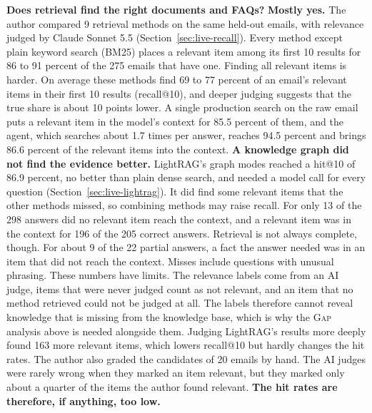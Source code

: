 \textbf{Does retrieval find the right documents and FAQs?} \textbf{Mostly yes.} The author compared 9 retrieval methods on the same held-out emails, with relevance judged by Claude Sonnet 5.5 (Section~\ref{sec:live-recall}). Every method except plain keyword search (BM25) places a relevant item among its first 10 results for 86 to 91 percent of the 275 emails that have one. Finding all relevant items is harder. On average these methods find 69 to 77 percent of an email's relevant items in their first 10 results (recall@10), and deeper judging suggests that the true share is about 10 points lower. A single production search on the raw email puts a relevant item in the model's context for 85.5 percent of them, and the agent, which searches about 1.7 times per answer, reaches 94.5 percent and brings 86.6 percent of the relevant items into the context. \textbf{A knowledge graph did not find the evidence better.} LightRAG's graph modes reached a hit@10 of 86.9 percent, no better than plain dense search, and needed a model call for every question (Section~\ref{sec:live-lightrag}). It did find some relevant items that the other methods missed, so combining methods may raise recall. For only 13 of the 298 answers did no relevant item reach the context, and a relevant item was in the context for 196 of the 205 correct answers. Retrieval is not always complete, though. For about 9 of the 22 partial answers, a fact the answer needed was in an item that did not reach the context. Misses include questions with unusual phrasing. These numbers have limits. The relevance labels come from an AI judge, items that were never judged count as not relevant, and an item that no method retrieved could not be judged at all. The labels therefore cannot reveal knowledge that is missing from the knowledge base, which is why the \textsc{Gap} analysis above is needed alongside them. Judging LightRAG's results more deeply found 163 more relevant items, which lowers recall@10 but hardly changes the hit rates. The author also graded the candidates of 20 emails by hand. The AI judges were rarely wrong when they marked an item relevant, but they marked only about a quarter of the items the author found relevant. \textbf{The hit rates are therefore, if anything, too low.}

